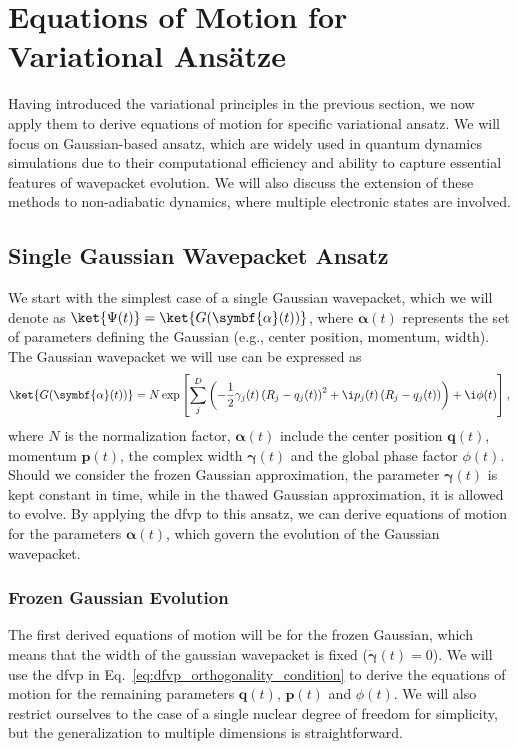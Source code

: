 \section{Equations of Motion for Variational Ans\"atze}\label{sec:variational_principles_eom}
Having introduced the variational principles in the previous section, we now apply them to derive equations of motion for specific variational ansatz. We will focus on Gaussian-based ansatz, which are widely used in quantum dynamics simulations due to their computational efficiency and ability to capture essential features of wavepacket evolution. We will also discuss the extension of these methods to non-adiabatic dynamics, where multiple electronic states are involved.
\subsection{Single Gaussian Wavepacket Ansatz}
We start with the simplest case of a single Gaussian wavepacket, which we will denote as $\ket{\Psi(t)}=\ket{G(\symbf{\alpha}(t))}$, where $\symbf{\alpha}(t)$ represents the set of parameters defining the Gaussian (e.g., center position, momentum, width). The Gaussian wavepacket we will use can be expressed as
\begin{equation}
\ket{G(\symbf{\alpha}(t))}=N\exp\left[\sum_j^D\left(-\frac{1}{2}\gamma_j(t)\left(R_j-q_j(t)\right)^2+\i p_j(t)\left(R_j-q_j(t)\right)\right)+\i\phi(t)\right],
\end{equation}
where $N$ is the normalization factor, $\symbf{\alpha}(t)$ include the center position $\symbf{q}(t)$, momentum $\symbf{p}(t)$, the complex width $\symbf{\gamma}(t)$ and the global phase factor $\phi(t)$. Should we consider the frozen Gaussian approximation, the parameter $\symbf{\gamma}(t)$ is kept constant in time, while in the thawed Gaussian approximation, it is allowed to evolve. By applying the \acrshort{dfvp} to this ansatz, we can derive equations of motion for the parameters $\symbf{\alpha}(t)$, which govern the evolution of the Gaussian wavepacket.
\subsubsection{Frozen Gaussian Evolution}
The first derived equations of motion will be for the frozen Gaussian, which means that the width of the gaussian wavepacket is fixed ($\dot{\symbf{\gamma}}(t)=0$). We will use the \acrshort{dfvp} in Eq.~\eqref{eq:dfvp_orthogonality_condition} to derive the equations of motion for the remaining parameters $\symbf{q}(t)$, $\symbf{p}(t)$ and $\phi(t)$. We will also restrict ourselves to the case of a single nuclear degree of freedom for simplicity, but the generalization to multiple dimensions is straightforward.

